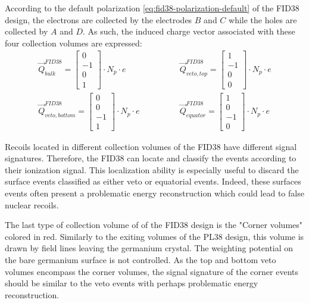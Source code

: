 According to the default polarization \ref{eq:fid38-polarization-default} of the FID38 design, the electrons are collected by the electrodes $B$ and $C$ while the holes are collected by $A$ and $D$. As such, the induced charge vector associated with these four collection volumes are expressed:
\begin{equation}
\label{eq:fid38-induced-charges}
\begin{array}{rr}
\vec{Q}_{bulk}^{FID38} =
\begin{bmatrix}
0 \\ -1 \\ 0 \\ 1
\end{bmatrix}
\cdot N_p \cdot e
\quad \quad
&
\quad \quad
\vec{Q}_{veto,top}^{FID38} =
\begin{bmatrix}
1 \\ -1 \\ 0 \\ 0
\end{bmatrix}
\cdot N_p \cdot e
\\
\vec{Q}_{veto,bottom}^{FID38} =
\begin{bmatrix}
0 \\ 0 \\ -1 \\ 1
\end{bmatrix}
\cdot N_p \cdot e
\quad \quad
&
\quad \quad
\vec{Q}_{equator}^{FID38} =
\begin{bmatrix}
1 \\ 0 \\ -1 \\ 0
\end{bmatrix}
\cdot N_p \cdot e
\end{array}
\end{equation}

Recoils located in different collection volumes of the FID38 have different signal signatures. Therefore, the FID38 can locate and classify the events according to their ionization signal. This localization ability is especially useful to discard the surface events classified as either veto or equatorial events. Indeed, these surfaces events often present a problematic energy reconstruction which could lead to false nuclear recoils.

The last type of collection volume of of the FID38 design is the "Corner volumes" colored in red. Similarly to the exiting volumes of the PL38 design, this volume is drawn by field lines leaving the germanium crystal. The weighting potential on the bare germanium surface is not controlled. As the top and bottom veto volumes encompass the corner volumes, the signal signature of the corner events should be similar to the veto events with perhaps problematic energy reconstruction.

